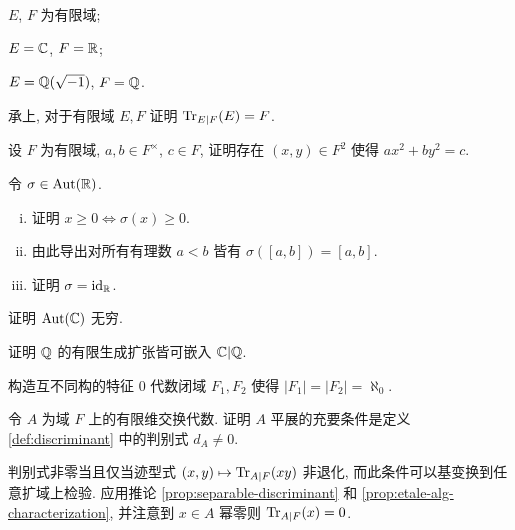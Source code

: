 \begin{Exercises}
		\begin{compactenum}[(i)]
			\item $E$, $F$ 为有限域; 
			\item $E=\mathbb{C}$, $F=\mathbb{R}$;
			\item $E=\mathbb{Q}(\sqrt{-1})$, $F=\mathbb{Q}$.
		\end{compactenum}
	\item 承上, 对于有限域 $E, F$ 证明 $\operatorname{Tr}_{E|F}(E)=F$.
	\item 设 $F$ 为有限域, $a, b \in F^\times$, $c \in F$, 证明存在 $(x,y) \in F^2$ 使得 $ax^2 + by^2 = c$.
	\item 令 $\sigma \in \operatorname{Aut}(\mathbb{R})$.
		\begin{enumerate}[(i)]
			\item 证明 $x \geq 0 \iff \sigma(x) \geq 0$. 
			\item 由此导出对所有有理数 $a < b$ 皆有 $\sigma([a,b]) = [a,b]$.
			\item 证明 $\sigma = \mathrm{id}_{\mathbb{R}}$.
		\end{enumerate}
	\item 证明 $\operatorname{Aut}(\mathbb{C})$ 无穷.
	\item 证明 $\mathbb{Q}$ 的有限生成扩张皆可嵌入 $\mathbb{C}|\mathbb{Q}$.
	\item 构造互不同构的特征 $0$ 代数闭域 $F_1, F_2$ 使得 $|F_1|=|F_2|=\aleph_0$.
	\item 令 $A$ 为域 $F$ 上的有限维交换代数. 证明 $A$ 平展的充要条件是定义 \ref{def:discriminant} 中的判别式 $d_A \neq 0$.
	\begin{hint}
		判别式非零当且仅当迹型式 $(x,y) \mapsto \operatorname{Tr}_{A|F}(xy)$ 非退化, 而此条件可以基变换到任意扩域上检验. 应用推论 \ref{prop:separable-discriminant} 和 \ref{prop:etale-alg-characterization}, 并注意到 $x \in A$ 幂零则 $\operatorname{Tr}_{A|F}(x)=0$.
	\end{hint}
\end{Exercises}